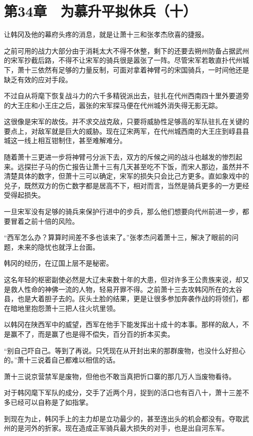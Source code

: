 \section{第34章　为慕升平拟休兵（十）}

让韩冈及他的幕府头疼的消息，就是让萧十三和张孝杰欣喜的捷报。

之前可用的战力大部分由于消耗太大不得不休整，剩下的还要去朔州防备占据武州的宋军抄截后路，不得不让宋军的骑兵很是嚣张了一阵。尽管宋军若敢直扑代州城下，萧十三依然有足够的力量反制，可面对拿着神臂弓的宋国骑兵，一时间他还是缺乏有效的应对手段。

不过自从将麾下恢复战斗力的六千多精锐派出去，驻扎在代州西南四十里外要道旁的大王庄和小王庄之后，嚣张的宋军探马便在代州城外消失得无影无踪。

这很像是宋军的故伎。并不求交战克敌，只要将威胁性足够高的军队驻扎在关键的要点上，对敌军就是巨大的威胁。现在辽宋两军，在代州城西南的大王庄到崞县县城这一线上相互钳制住，甚至难解难分。

随着萧十三更进一步将神臂弓分派下去，双方的斥候之间的战斗也越发的惨烈起来。远探拦子马的伤亡报告让萧十三有几天甚至吃不下饭，而宋人那边，虽然并不清楚具体的数字，但萧十三可以确定，宋军的损失只会比己方更多。直如象戏中的兑子，既然双方的伤亡数字都是居高不下，相对而言，当然是骑兵更多的一方更经受得起损失。

一旦宋军没有足够的骑兵来保护行进中的步兵，那么他们想要向代州前进一步，都要冒着之前十倍的风险。

“西军怎么办？算算时间差不多也该来了。”张孝杰问着萧十三，解决了眼前的问题，未来的隐忧也就浮上台面。

韩冈的经历，在辽国上层不是秘密。

这名年轻的枢密副使必然是大辽未来数十年的大患，但对许多王公贵族来说，却又是救人性命的神佛一流的人物，轻易开罪不得。之前萧十三去攻韩冈所在的太谷县，也是大着胆子去的。灰头土脸的结果，更是让很多参加奔袭作战的将领们，都在暗地里抱怨萧十三把人往火坑里领。

以韩冈在陕西军中的威望，西军在他手下能发挥出十成十的本事。那样的敌人，不是赢不了，而是赢了也是得不偿失，百分百的折本买卖。

“别自己吓自己。等到了再说。只凭现在从开封出来的那群废物，也没什么好担心的。”萧十三说着自己都难以相信的话。

萧十三说京营禁军是废物，但他也不敢当真把忻口寨的那几万人当废物看待。

对于韩冈麾下军队的成分，交手了近两个月，捉到的活口也有百八十，萧十三差不多已经可以自称是了如指掌。

到现在为止，韩冈手上的主力却是立功最少的，甚至连出头的机会都没有。夺取武州的是河外的折家。现在造成正军骑兵最大损失的对手，也是出自河东军。

